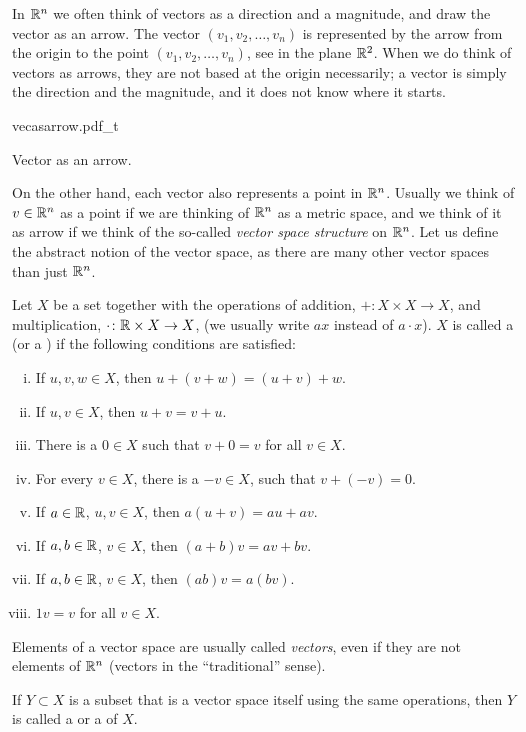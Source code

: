 In ${\mathbb{R}}^n$ we often think of vectors as a direction and a magnitude, and draw the
vector as an arrow.  The vector $(v_1,v_2,\ldots,v_n)$ is represented
by the arrow from the origin to the point $(v_1,v_2,\ldots,v_n)$, see
 in the plane ${\mathbb{R}}^2$.
When we do think of vectors as arrows, they are
not based at the origin necessarily; a vector is simply the direction and
the magnitude, and it does not know where it starts.
\begin{myfigureht}
{vecasarrow.pdf_t}
\caption{Vector as an arrow.\label{fig:vecasarrow}}
\end{myfigureht}

On the other hand, each
vector also represents a point in ${\mathbb{R}}^n$.  Usually we think of $v \in {\mathbb{R}}^n$
as a point if we are thinking of ${\mathbb{R}}^n$ as a metric space, and we think of
it as arrow if we think of the so-called \emph{vector space structure} on
${\mathbb{R}}^n$.
Let us define the abstract notion of the vector space, as there
are many other vector spaces than just ${\mathbb{R}}^n$.

\begin{defn}
Let $X$ be a set together with
the operations of addition, $+ \colon X \times X \to X$,
and multiplication, $\cdot \colon {\mathbb{R}} \times X \to X$, (we usually write $ax$ instead of $a
\cdot x$).  $X$ is called a \emph{} (or a
\emph{})
if the following conditions are satisfied:
\begin{enumerate}[(i)]
\item
{}
If $u, v, w \in X$, then $u+(v+w) = (u+v)+w$.
\item
{}
If $u, v \in X$, then $u+v = v+u$.
\item \label{vecspacedefn:addidentity}
There is a $0 \in X$ such that $v+0=v$ for all $v \in X$.
\item
{}
For every $v \in X$, there is a $-v \in X$,
such that $v+(-v)=0$.
\item
{}
If $a \in {\mathbb{R}}$, $u,v \in X$, then
$a(u+v) = au+av$.
\item
{}
If $a,b \in {\mathbb{R}}$, $v \in X$, then
$(a+b)v = av+bv$.
\item
{}
If $a,b \in {\mathbb{R}}$, $v \in X$, then
$(ab)v = a(bv)$.
\item
{}
$1v = v$ for all $v \in X$.
\end{enumerate}
Elements of a vector space are usually called \emph{vectors},
even if they
are not elements of ${\mathbb{R}}^n$ (vectors in the ``traditional'' sense).

If $Y \subset X$ is a subset that is a vector space itself using the same
operations, then $Y$ is called a \emph{} or
a \emph{} of $X$.
\end{defn}

